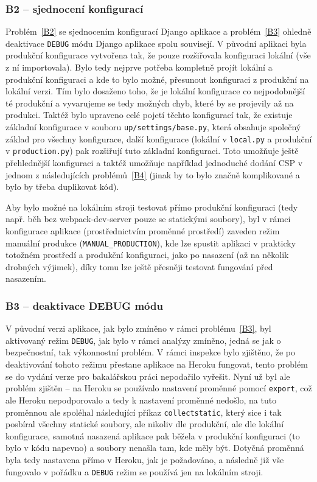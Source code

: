 \subsubsection{B2 -- sjednocení konfigurací}

Problém~\ref{B2} se sjednocením konfigurací Django aplikace a problém~\ref{B3} ohledně deaktivace \verb|DEBUG| módu Django aplikace spolu souvisejí. V původní aplikaci byla produkční konfigurace vytvořena tak, že pouze rozšiřovala konfiguraci lokální (vše z ní importovala). Bylo tedy nejprve potřeba kompletně projít lokální a produkční konfiguraci a kde to bylo možné, přesunout konfiguraci z produkční na lokální verzi. Tím bylo dosaženo toho, že je lokální konfigurace co nejpodobnější té produkční a vyvarujeme se tedy možných chyb, které by se projevily až na produkci. Taktéž bylo upraveno celé pojetí těchto konfigurací tak, že existuje základní konfigurace v souboru \verb|up/settings/base.py|, která obsahuje společný základ pro všechny konfigurace, další konfigurace (lokální v \verb|local.py| a produkční v \verb|production.py|) pak rozšiřují tuto základní konfiguraci. Toto umožňuje ještě přehlednější konfiguraci a taktéž umožňuje například jednoduché dodání CSP v jednom z následujících problémů~\ref{B4} (jinak by to bylo značně komplikované a bylo by třeba duplikovat kód).

Aby bylo možné na lokálním stroji testovat přímo produkční konfiguraci (tedy např. běh bez webpack-dev-server pouze se statickými soubory), byl v rámci konfigurace aplikace (prostřednictvím proměnné prostředí) zaveden režim manuální produkce (\verb|MANUAL_PRODUCTION|), kde lze spustit aplikaci v prakticky totožném prostředí a produkční konfiguraci, jako po nasazení (až na několik drobných výjimek), díky tomu lze ještě přesněji testovat fungování před nasazením. 

\subsubsection{B3 -- deaktivace DEBUG módu}

V původní verzi aplikace, jak bylo zmíněno v rámci problému~\ref{B3}, byl aktivovaný režim \verb|DEBUG|, jak bylo v rámci analýzy zmíněno, jedná se jak o bezpečnostní, tak výkonnostní problém. V rámci inspekce bylo zjištěno, že po deaktivování tohoto režimu přestane aplikace na Heroku fungovat, tento problém se do vydání verze pro bakalářskou práci nepodařilo vyřešit. Nyní už byl ale problém zjištěn -- na Heroku se používalo nastavení proměnné pomocí \verb|export|, což ale Heroku nepodporovalo a tedy k nastavení proměnné nedošlo, na tuto proměnnou ale spoléhal následující příkaz \verb|collectstatic|, který sice i tak posbíral všechny statické soubory, ale nikoliv dle produkční, ale dle lokální konfigurace, samotná nasazená aplikace pak běžela v produkční konfiguraci (to bylo v kódu napevno) a soubory nenašla tam, kde měly být. Dotyčná proměnná byla tedy nastavena přímo v Heroku, jak je požadováno, a následně již vše fungovalo v pořádku a \verb|DEBUG| režim se používá jen na lokálním stroji.

